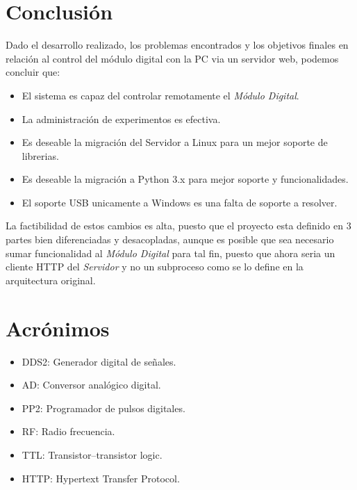 \section{Conclusi\'on}

Dado el desarrollo realizado, los problemas encontrados y los objetivos finales en relaci\'on
al control del m\'odulo digital con la PC via un servidor web, podemos concluir que:

\begin{itemize}
    \item El sistema es capaz del controlar remotamente el \textit{M\'odulo Digital}.
    \item La administraci\'on de experimentos es efectiva.
    \item Es deseable la migraci\'on del Servidor a Linux para un mejor soporte de librerias.
    \item Es deseable la migraci\'on a Python 3.x para mejor soporte y funcionalidades.
    \item El soporte USB unicamente a Windows es una falta de soporte a resolver.
\end{itemize}

La factibilidad de estos cambios es alta, puesto que el proyecto esta definido en 3 partes
bien diferenciadas y desacopladas, aunque es posible que sea necesario sumar funcionalidad 
al \textit{M\'odulo Digital} para tal fin, puesto que ahora seria un cliente HTTP del \textit{Servidor} y
no un subproceso como se lo define en la arquitectura original.

\newpage

\section{Acr\'onimos}

\begin{itemize}
    \item DDS2: Generador digital de señales.
    \item AD: Conversor anal\'ogico digital.
    \item PP2: Programador de pulsos digitales.
    \item RF: Radio frecuencia.
    \item TTL: Transistor–transistor logic.
    \item HTTP: Hypertext Transfer Protocol.
\end{itemize}

\newpage